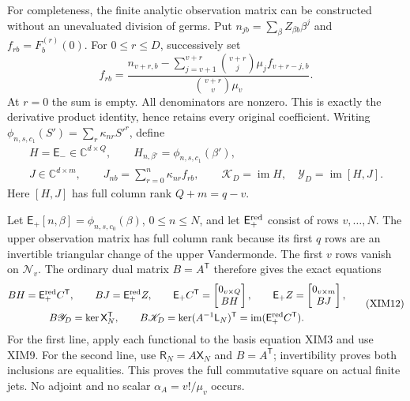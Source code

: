 \documentclass[11pt,a4paper]{article}
\begin{document}
For completeness, the finite analytic observation matrix can be
constructed without an unevaluated division of germs. Put
$n_{jb}=\sum_\beta Z_{\beta b}\beta^j$ and $f_{rb}=F_b^{(r)}(0)$.
For $0\le r\le D$, successively set
\[
 f_{rb}=
 \frac{n_{v+r,b}-\displaystyle\sum_{j=v+1}^{v+r}
          \binom{v+r}{j}\mu_j f_{v+r-j,b}}
      {\binom{v+r}{v}\mu_v}.
 \tag{XIM10}
\]
At $r=0$ the sum is empty. All denominators are nonzero. This is
exactly the derivative product identity, hence retains every original
coefficient. Writing $\phi_{n,s,c_1}(S')=\sum_r\kappa_{nr}S'^r$,
define
\[
\begin{gathered}
 H=\mathsf E_-\in\mathbb C^{d\times Q},\qquad
 H_{n,\beta'}=\phi_{n,s,c_1}(\beta'),\\
 J\in\mathbb C^{d\times m},\qquad
 J_{nb}=\sum_{r=0}^n\kappa_{nr}f_{rb},\qquad
 \mathscr K_D=\operatorname{im}H,\quad
 \mathscr Y_D=\operatorname{im}[H,J].
\end{gathered}\tag{XIM11}
\]
Here $[H,J]$ has full column rank $Q+m=q-v$.

Let $\mathsf E_+[n,\beta]=\phi_{n,s,c_0}(\beta)$, $0\le n\le N$,
and let $\mathsf E_+^{\rm red}$ consist of rows $v,\ldots,N$.
The upper observation matrix has full column rank because its first
$q$ rows are an invertible triangular change of the upper Vandermonde.
The first $v$ rows vanish on $\mathscr N_v$. The ordinary dual
matrix $B=A^{\mathsf T}$ therefore gives the exact equations
\[
\begin{gathered}
 BH=\mathsf E_+^{\rm red}C^{\mathsf T},\qquad
 BJ=\mathsf E_+^{\rm red}Z,\qquad
 \mathsf E_+C^{\mathsf T}=\begin{bmatrix}0_{v\times Q}\\BH\end{bmatrix},
 \qquad \mathsf E_+Z=\begin{bmatrix}0_{v\times m}\\BJ\end{bmatrix},\\
 B\mathscr Y_D=\ker\mathsf X_N^{\mathsf T},\qquad
 B\mathscr K_D=\ker(A^{-1}\mathsf L_N)^{\mathsf T}
                =\operatorname{im}(\mathsf E_+^{\rm red}C^{\mathsf T}).
\end{gathered}\tag{XIM12}
\]
For the first line, apply each functional to the basis equation XIM3
and use XIM9. For the second line, use $\mathsf R_N=A\mathsf X_N$
and $B=A^{\mathsf T}$; invertibility proves both inclusions are
equalities. This proves the full commutative square on actual finite
jets. No adjoint and no scalar $\alpha_A=v!/\mu_v$ occurs.
\end{document}
